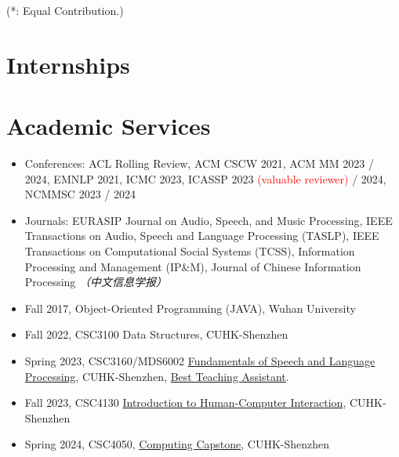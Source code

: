 \documentclass{resume}
\begin{document}
(*: Equal Contribution.)

\section{Internships}
{\small {}
}

{\small {}
}

\section{Academic Services}
\begin{itemize}
  \item Conferences: ACL Rolling Review, ACM CSCW 2021, ACM MM 2023 / 2024, EMNLP 2021, ICMC 2023, ICASSP 2023
        \textcolor{red}{(valuable
          reviewer)} / 2024, NCMMSC 2023 / 2024
  \item Journals: EURASIP Journal on Audio, Speech, and Music Processing, IEEE
        Transactions on Audio, Speech and Language Processing (TASLP), IEEE
        Transactions on Computational Social Systems (TCSS), Information Processing and
        Management (IP\&M), Journal of Chinese Information Processing \textit{（中文信息学报）}
\end{itemize}
\begin{itemize}
  \item Fall 2017, Object-Oriented Programming (JAVA), Wuhan University
  \item Fall 2022, CSC3100 Data Structures, CUHK-Shenzhen
  \item Spring 2023, CSC3160/MDS6002
        \href{https://drwuz.com/CSC3160/index.html}{Fundamentals of Speech and Language
          Processing}, CUHK-Shenzhen,
        \href{https://www.zhangxueyao.com/data/presentations/20230521_ta_award.pdf}{Best
          Teaching Assistant}.
  \item Fall 2023, CSC4130 \href{https://stevenhan1991.github.io/CSC4130/index.html}{Introduction to Human-Computer Interaction}, CUHK-Shenzhen
  \item Spring 2024, CSC4050, \href{https://drwuz.com/csc4050/}{Computing Capstone}, CUHK-Shenzhen
\end{itemize}
\end{document}
